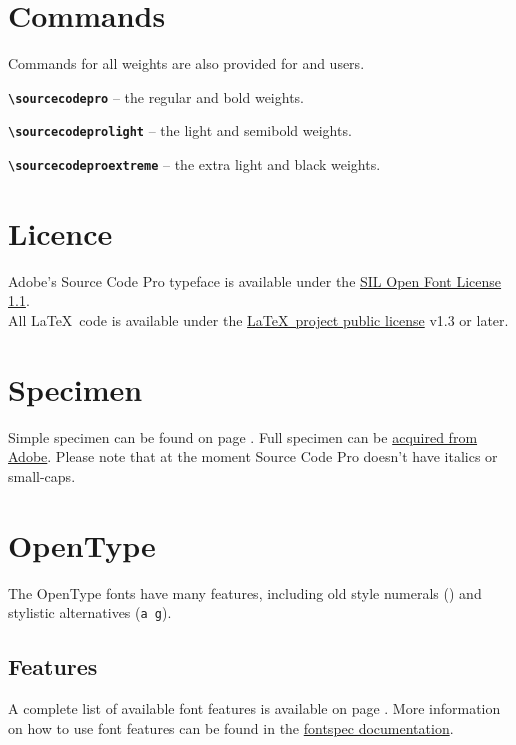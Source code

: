 \documentclass[11pt,a4paper,english]{article}
\begin{document}
\begin{multicols}{2}
\section{Commands}
Commands for all weights are also provided for  and  users.
\begin{itemize*}
	\item \texttt{\bfseries \textbackslash sourcecodepro}
		-- the regular and bold weights.
	\item \texttt{\bfseries \textbackslash sourcecodeprolight}
		-- the light and semibold weights.
	\item \texttt{\bfseries \textbackslash sourcecodeproextreme}
		-- the extra light and black weights.
\end{itemize*}

\section{Licence}
Adobe's Source Code Pro typeface is available under the \href{http://scripts.sil.org/OFL}{SIL Open Font License 1.1}.\\
All \LaTeX\ code is available under the \href{http://www.latex-project.org/lppl/}{\LaTeX\ project public license} v1.3 or later.

\section{Specimen}
Simple specimen can be found on page \pageref{sec:specimen}. Full specimen can be \href{http://store1.adobe.com/type/browser/pdfs/1960.pdf}{acquired from Adobe}. Please note that at the moment Source Code Pro doesn’t have italics or small-caps.

\section{OpenType}
The OpenType fonts have many features, including old style numerals (\texttt{})
and stylistic alternatives (\texttt{{a g}}).

\subsection{Features}
A complete list of available font features is available on page \pageref{sec:otfinfo}. More information on how to use font features can be found in the \href{http://mirror.ctan.org/macros/latex/contrib/fontspec/fontspec.pdf}{fontspec documentation}.


\end{multicols}
\end{document}
